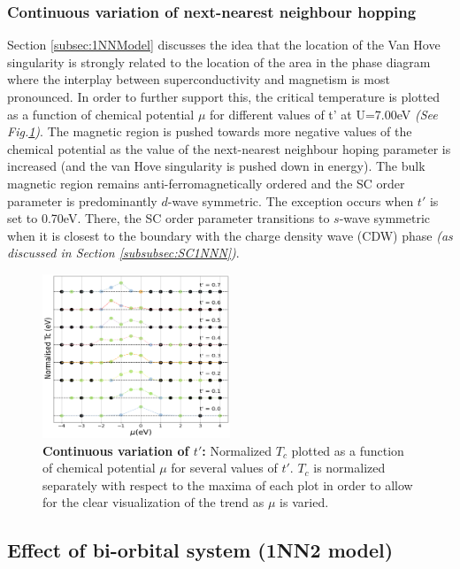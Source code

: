 \documentclass[12pt]{article}
\begin{document}
\subsubsection{Continuous variation of next-nearest neighbour hopping}


Section \ref{subsec:1NNModel} discusses the idea that the location of the 
Van Hove singularity is strongly related to the location of the area in the phase diagram where the interplay between 
superconductivity and magnetism is most pronounced. In order to further support this, the critical temperature
is plotted as a function of chemical potential $\mu$ for different values of t' at U=7.00eV \textit{(See Fig.\ref{fig:tprimecont})}.
The magnetic region is pushed towards more negative values of the chemical potential as the value of the next-nearest 
neighbour hoping parameter is increased (and the van Hove singularity is pushed down in energy). The bulk magnetic
region remains anti-ferromagnetically ordered and the SC order parameter is predominantly $d$-wave symmetric. The exception occurs when
$t'$ is set to 0.70eV. There, the SC order parameter transitions to $s$-wave symmetric when it is closest to the boundary 
with the charge density wave (CDW) phase \textit{(as discussed in Section \ref{subsubsec:SC1NNN})}.

\begin{figure}[htbp]  %
    \centering
    \includegraphics[width=0.50\textwidth]{tprimecont.png}  %
    \caption{ \textbf{Continuous variation of $t'$:} Normalized $T_c$ plotted as a function of chemical 
    potential $\mu$ for several values of $t'$. $T_c$ is normalized separately with respect to the 
    maxima of each plot in order to allow for the clear visualization of the trend as $\mu$ is varied.  }
    \label{fig:tprimecont}
\end{figure}


\subsection{Effect of bi-orbital system (1NN2 model)}
\label{subsec:1NN2Model}
\end{document}
